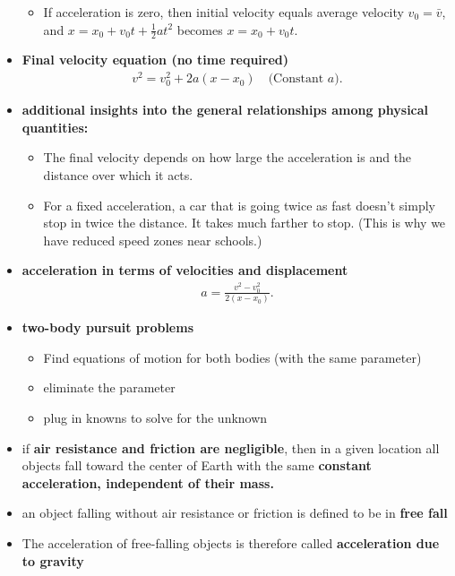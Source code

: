 \documentclass{report}
\begin{document}
\begin{itemize}
\begin{itemize}
                \item If acceleration is zero, then initial velocity equals average velocity \(v_0 = \bar{v}\), and \(x = x_0 + v_0t + \frac{1}{2}at^2\) becomes \(x = x_0 + v_0t\).
            \end{itemize}
        \item \textbf{Final velocity equation (no time required)}
            \begin{align*}
                v^{2} = v_{0}^{2} + 2a(x-x_{0}) \quad \text{(Constant $a$)}
            .\end{align*}
        \item \textbf{additional insights into the general relationships among physical quantities:}
            \begin{itemize}
                \item The final velocity depends on how large the acceleration is and the distance over which it acts.
                \item For a fixed acceleration, a car that is going twice as fast doesn’t simply stop in twice the distance. It takes much farther to stop. (This is why we have reduced speed zones near schools.)
            \end{itemize}
        \item \textbf{acceleration in terms of velocities and displacement}
            \begin{align*}
                a  = \frac{v^{2} - v_{0}^{2}}{2(x-x_{0})}
            .\end{align*}
        \item \textbf{two-body pursuit problems}
            \begin{itemize}
                \item Find equations of motion for both bodies (with the same parameter)
                \item eliminate the parameter
                \item plug in knowns to solve for the unknown
            \end{itemize}
        \item if \textbf{air resistance and friction are negligible}, then in a given location all objects fall toward the center of Earth with the same \textbf{constant acceleration, independent of their mass.} 
        \item an object falling without air resistance or friction is defined to be in \textbf{free fall}
        \item The acceleration of free-falling objects is therefore called \textbf{acceleration due to gravity}

\end{itemize}
\end{document}
